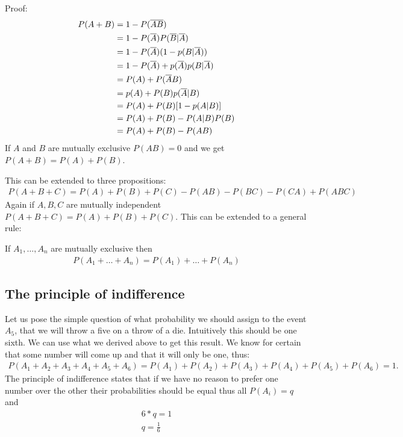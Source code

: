 Proof:
\begin{align}
  P(A+B)&= 1- P(\overline{A}\overline{B}) \\
        &= 1-P(\overline{A})P(\overline{B}|\overline{A}) \\
        &= 1 - P(\overline{A})(1-p(B|\overline{A}))\\
        &= 1- P(\overline{A}) + p(\overline{A})p(B|\overline{A})\\
        &= P(A) + P(\overline{A}B)\\
        &=p(A)+P(B)p(\overline{A}|B) \\
        &=P(A)+P(B)[1-p(A|B)] \\
        &=P(A)+P(B)- P(A|B)P(B) \\
        &=P(A)+P(B) - P(AB)
\end{align}
If $A$ and $B$ are mutually exclusive $P(AB)=0$ and we get $P(A+B) = P(A)+P(B)$.

This can be extended to three propositions:
\begin{align}
  P(A+B+C) = P(A)+P(B)+P(C) - P(AB) - P(BC) - P(CA) + P(ABC)
\end{align}
Again if $A,B,C$ are mutually independent $P(A+B+C) = P(A) + P(B) +P(C)$.
This can be extended to a general rule:

If $A_1, \hdots, A_n$ are mutually exclusive 
then \begin{align}
  P(A_1+\hdots+A_n) = P(A_1) + \hdots + P(A_n)
\end{align}

\subsection{The principle of indifference}
Let us pose the simple question of what probability 
we should assign to the event $A_5$, that we will throw a five on a throw of a die.
Intuitively this should be one sixth. 
We can use what we derived above to get this result.
We know for certain that some number will come up and that it will only be one, thus:
\begin{align}
  P(A_1+A_2+A_3+A_4+A_5+A_6) = P(A_1) + P(A_2) + P(A_3) + P(A_4) +P(A_5)+P(A_6)=1.
\end{align}
The principle of indifference states that if we have no reason to prefer one number over the other 
their probabilities should be equal thus all $P(A_i) = q$ and 
\begin{align}
  6*q = 1\\
  q = \frac{1}{6}
\end{align}

